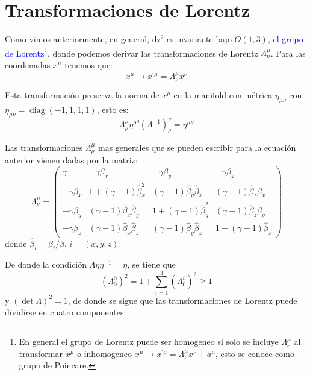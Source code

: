 \documentclass[../main]{subfiles}
\begin{document}
\section{Transformaciones de Lorentz}
Como vimos anteriormente, en general, $\mathrm{d}\tau^2$ es invariante bajo $O(1, 3)$, \textcolor{blue}{el grupo de Lorentz}\footnote{En general el grupo de Lorentz puede ser homogeneo si solo se incluye $\Lambda^{\mu}_\nu$ al transformar $x^{\mu}$ o inhomogeneo $x^{\mu} \rightarrow x^{'\mu}=\Lambda^{\mu}_{\nu}x^{\nu}+a^{\mu}$, esto se conoce como grupo de Poincare.}, donde podemos derivar las transformaciones de Lorentz $\Lambda^{\mu}_{\nu}$. Para las coordenadas $x^{\mu}$ tenemos que:
\begin{equation}
    x^{\mu} \rightarrow x^{'\mu}=\Lambda^{\mu}_{\nu} x^{\nu}
\end{equation}

Esta transformación preserva la norma de $x^{\mu}$ en la manifold con métrica $\eta_{\mu\nu}$ con $\eta_{\mu\nu}=\operatorname{diag} (-1, 1, 1, 1)$, esto es:
\begin{equation}
    \Lambda^{\mu}_{\rho} \eta^{\rho\theta}(\Lambda^{-1})^{\nu}_{\theta}=\eta^{\mu\nu}
\end{equation}

Las transformaciones $\Lambda^{\mu}_{\rho}$ mas generales que se pueden escribir para la ecuación anterior vienen dadas por la matriz:
\begin{equation}
    \Lambda^{\mu}_{\nu}=
    \begin{pmatrix}
        \gamma & -\gamma \beta_x & -\gamma \beta_y & -\gamma\beta_z \\
        -\gamma \beta_x & 1+(\gamma-1)\hat{\beta}^2_x & (\gamma-1)\hat{\beta}_y\hat{\beta}_x & (\gamma-1)\hat{\beta}_z\hat{\beta}_x \\ 
        -\gamma \beta_y & (\gamma-1)\hat{\beta}_x\hat{\beta}_y & 1+(\gamma-1)\hat{\beta}^2_y & (\gamma-1)\hat{\beta}_z\hat{\beta}_y \\
        -\gamma \beta_z & (\gamma-1)\hat{\beta}_x\hat{\beta}_z & (\gamma-1)\hat{\beta}_y\hat{\beta}_z & 1+(\gamma-1)\hat{\beta}_z
    \end{pmatrix}
\end{equation}
donde $\hat{\beta}_i=\beta_i/\beta$, $i=(x, y, z)$.

De donde la condición $\Lambda \eta \eta^{-1}=\eta$, se tiene que 
\begin{equation}
    (\Lambda^0_0)^2=1+\sum_{i=1}^3 (\Lambda^{i}_0)^2 \geq 1
\end{equation}
y $(\det \Lambda)^2=1$, de donde se sigue que las transformaciones de Lorentz puede dividirse en cuatro componentes:
\end{document}
